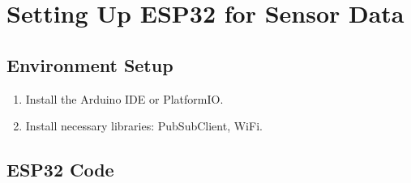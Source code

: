 \documentclass{article}
\begin{document}
\section{Setting Up ESP32 for Sensor Data}
\subsection{Environment Setup}
\begin{enumerate}
    \item Install the Arduino IDE or PlatformIO.
    \item Install necessary libraries: PubSubClient, WiFi.
\end{enumerate}

\subsection{ESP32 Code}
\end{document}
